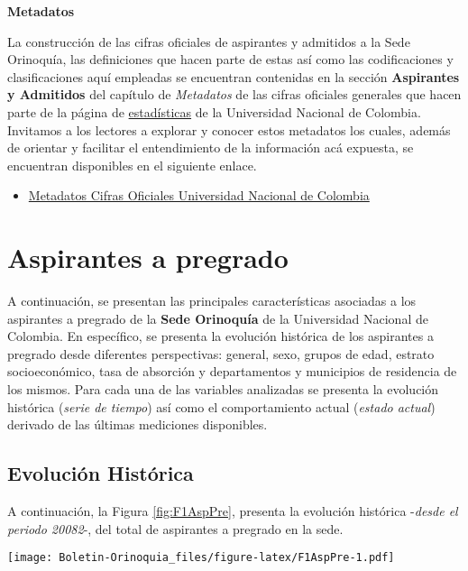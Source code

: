 \documentclass[
]{book}
\providecommand{\tightlist}{%
  \setlength{\itemsep}{0pt}\setlength{\parskip}{0pt}}
\begin{document}
\textbf{Metadatos}

La construcción de las cifras oficiales de aspirantes y admitidos a la Sede Orinoquía, las definiciones que hacen parte de estas así como las codificaciones y clasificaciones aquí empleadas se encuentran contenidas en la sección \textbf{Aspirantes y Admitidos} del capítulo de \emph{Metadatos} de las cifras oficiales generales que hacen parte de la página de \href{http://estadisticas.unal.edu.co/home/}{estadísticas} de la Universidad Nacional de Colombia. Invitamos a los lectores a explorar y conocer estos metadatos los cuales, además de orientar y facilitar el entendimiento de la información acá expuesta, se encuentran disponibles en el siguiente enlace.

\begin{itemize}
\tightlist
\item
  \href{http://estadisticas.unal.edu.co/menu-principal/cifras-generales/metadatos/cifras-generales/}{Metadatos Cifras Oficiales Universidad Nacional de Colombia}
\end{itemize}

\hypertarget{AspPre}{%
\section{Aspirantes a pregrado}\label{AspPre}}

A continuación, se presentan las principales características asociadas a los aspirantes a pregrado de la \textbf{Sede Orinoquía} de la Universidad Nacional de Colombia. En específico, se presenta la evolución histórica de los aspirantes a pregrado desde diferentes perspectivas: general, sexo, grupos de edad, estrato socioeconómico, tasa de absorción y departamentos y municipios de residencia de los mismos. Para cada una de las variables analizadas se presenta la evolución histórica (\emph{serie de tiempo}) así como el comportamiento actual (\emph{estado actual}) derivado de las últimas mediciones disponibles.

\hypertarget{evoluciuxf3n-histuxf3rica}{%
\subsection{Evolución Histórica}\label{evoluciuxf3n-histuxf3rica}}

A continuación, la Figura \ref{fig:F1AspPre}, presenta la evolución histórica -\emph{desde el periodo 20082}-, del total de aspirantes a pregrado en la sede.

\texttt{[image: Boletin-Orinoquia\_files/figure-latex/F1AspPre-1.pdf]}
\end{document}
